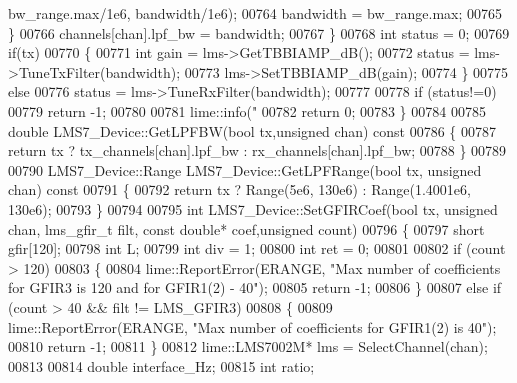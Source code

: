 \begin{DoxyCode}
{{      bw\_range.max/1e6, bandwidth/1e6);
00764             bandwidth = bw\_range.max;
00765         \}
00766         channels[chan].lpf\_bw = bandwidth;
00767     \}
00768     \textcolor{keywordtype}{int} status = 0;
00769     \textcolor{keywordflow}{if}(tx)
00770     \{
00771         \textcolor{keywordtype}{int} gain = lms->GetTBBIAMP_dB();
00772         status = lms->TuneTxFilter(bandwidth);
00773         lms->SetTBBIAMP_dB(gain);
00774     \}
00775     \textcolor{keywordflow}{else}
00776         status = lms->TuneRxFilter(bandwidth);
00777 
00778     \textcolor{keywordflow}{if} (status!=0)
00779         \textcolor{keywordflow}{return} -1;
00780 
00781     lime::info(\textcolor{stringliteral}{"%
00782     \textcolor{keywordflow}{return} 0;
00783 \}
00784 
00785 \textcolor{keywordtype}{double} LMS7_Device::GetLPFBW(\textcolor{keywordtype}{bool} tx,\textcolor{keywordtype}{unsigned} chan)\textcolor{keyword}{ const}
00786 \textcolor{keyword}{}\{
00787     \textcolor{keywordflow}{return} tx ? tx_channels[chan].lpf\_bw : rx_channels[chan].lpf\_bw;
00788 \}
00789 
00790 LMS7_Device::Range LMS7_Device::GetLPFRange(\textcolor{keywordtype}{bool} tx, \textcolor{keywordtype}{unsigned} chan)\textcolor{keyword}{ const}
00791 \textcolor{keyword}{}\{
00792     \textcolor{keywordflow}{return} tx ? Range(5e6, 130e6) : Range(1.4001e6, 130e6);
00793 \}
00794 
00795 \textcolor{keywordtype}{int} LMS7_Device::SetGFIRCoef(\textcolor{keywordtype}{bool} tx, \textcolor{keywordtype}{unsigned} chan, lms_gfir_t filt, \textcolor{keyword}{const} \textcolor{keywordtype}{double}* 
      coef,\textcolor{keywordtype}{unsigned} count)
00796 \{
00797     \textcolor{keywordtype}{short} gfir[120];
00798     \textcolor{keywordtype}{int} L;
00799     \textcolor{keywordtype}{int} div = 1;
00800     \textcolor{keywordtype}{int} ret = 0;
00801 
00802     \textcolor{keywordflow}{if} (count > 120)
00803     \{
00804         lime::ReportError(ERANGE, \textcolor{stringliteral}{"Max number of coefficients for GFIR3 is 120 and for GFIR1(2) - 40"});
00805         \textcolor{keywordflow}{return} -1;
00806     \}
00807     \textcolor{keywordflow}{else} \textcolor{keywordflow}{if} (count > 40 && filt != LMS_GFIR3)
00808     \{
00809         lime::ReportError(ERANGE, \textcolor{stringliteral}{"Max number of coefficients for GFIR1(2) is 40"});
00810         \textcolor{keywordflow}{return} -1;
00811     \}
00812     lime::LMS7002M* lms = SelectChannel(chan);
00813 
00814     \textcolor{keywordtype}{double} interface\_Hz;
00815     \textcolor{keywordtype}{int} ratio;
}}}
\end{DoxyCode}
